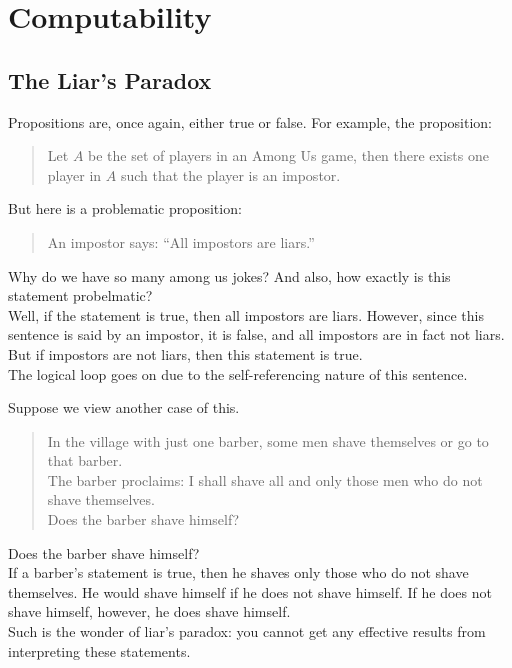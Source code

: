 \chapter{Computability}

\section{The Liar's Paradox}
Propositions are, once again, either true or false. For example, the proposition:
\begin{quote}
    Let $A$ be the set of players in an Among Us game, then there exists one player in $A$ such that the player is an impostor.
\end{quote}
But here is a problematic proposition:
\begin{quote}
    An impostor says: ``All impostors are liars.''
\end{quote}
Why do we have so many among us jokes? And also, how exactly is this statement probelmatic? \\
Well, if the statement is true, then all impostors are liars. However, since this sentence is said by an impostor, it is false, and all impostors are in fact not liars. But if impostors are not liars, then this statement is true. \\
The logical loop goes on due to the self-referencing nature of this sentence.

Suppose we view another case of this. \\
\begin{quote}
    In the village with just one barber, some men shave themselves or go to that barber. \\
    The barber proclaims: I shall shave all and only those men who do not shave themselves. \\
    Does the barber shave himself?
\end{quote}
Does the barber shave himself? \\
If a barber's statement is true, then he shaves only those who do not shave themselves. He would shave himself if he does not shave himself. If he does not shave himself, however, he does shave himself. \\
Such is the wonder of liar's paradox: you cannot get any effective results from interpreting these statements.

